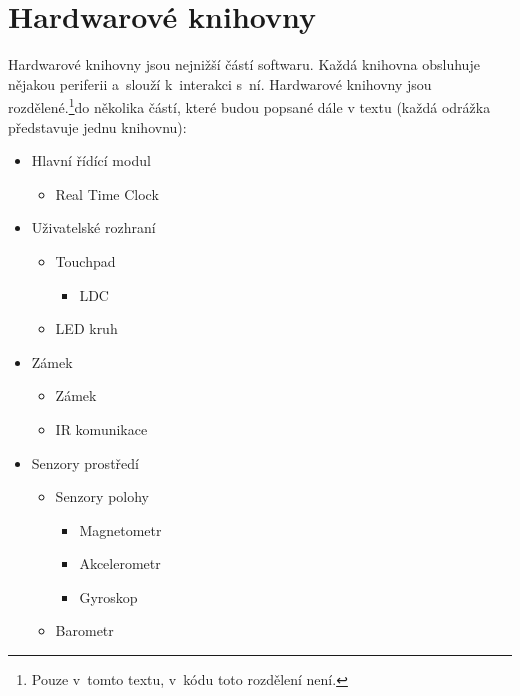 \chapter{Hardwarové knihovny}
Hardwarové knihovny jsou nejnižší částí softwaru.
Každá knihovna obsluhuje nějakou periferii a~slouží k~interakci s~ní.
Hardwarové knihovny jsou rozdělené.\footnote{Pouze v~tomto textu, v~kódu toto rozdělení není.}do několika částí, které budou popsané dále v textu (každá odrážka představuje jednu knihovnu):

\begin{itemize}[noitemsep]
    \item Hlavní řídící modul
          \begin{itemize}[noitemsep]
              \item Real Time Clock
          \end{itemize}
    \item Uživatelské rozhraní
          \begin{itemize}[noitemsep]
              \item Touchpad
                    \begin{itemize}[noitemsep]
                        \item LDC
                    \end{itemize}
              \item LED kruh
          \end{itemize}
    \item Zámek
          \begin{itemize}[noitemsep]
              \item Zámek
              \item IR komunikace
          \end{itemize}
    \item Senzory prostředí
          \begin{itemize}[noitemsep]
              \item Senzory polohy
                    \begin{itemize}[noitemsep]
                        \item Magnetometr
                        \item Akcelerometr
                        \item Gyroskop
                    \end{itemize}
              \item Barometr
          \end{itemize}
\end{itemize}


